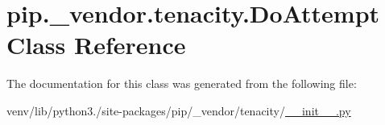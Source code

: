 \hypertarget{classpip_1_1__vendor_1_1tenacity_1_1DoAttempt}{}\section{pip.\+\_\+vendor.\+tenacity.\+Do\+Attempt Class Reference}
\label{classpip_1_1__vendor_1_1tenacity_1_1DoAttempt}


The documentation for this class was generated from the following file\+:\begin{DoxyCompactItemize}
\item 
venv/lib/python3./site-\/packages/pip/\+\_\+vendor/tenacity/\hyperlink{venv_2lib_2python3_89_2site-packages_2pip_2__vendor_2tenacity_2____init_____8py}{\+\_\+\+\_\+init\+\_\+\+\_\+.\+py}\end{DoxyCompactItemize}
